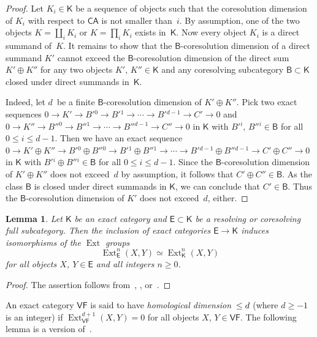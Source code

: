 \documentclass[12pt,a4paper]{amsart}
\newcommand{\+}{\nobreakdash-}
\renewcommand{\:}{\colon}
\newcommand{\rarrow}{\longrightarrow}
\DeclareMathOperator{\Ext}{Ext}
\newcommand{\sB}{\mathsf B}
\newcommand{\sE}{\mathsf E}
\newcommand{\sK}{\mathsf K}
\newcommand{\VF}{\mathsf{VF}}
\newcommand{\CA}{\mathsf{CA}}
\theoremstyle{plain}
\newtheorem{lem}[thm]{Lemma}
\theoremstyle{definition}
\begin{document}
\begin{proof}
 Let $K_i\in\sK$ be a sequence of objects such that the coresolution
dimension of $K_i$ with respect to $\CA$ is not smaller than~$i$.
 By assumption, one of the two objects $K=\coprod_i K_i$ or
$K=\prod_i K_i$ exists in~$\sK$.
 Now every object $K_i$ is a direct summand of~$K$.
 It remains to show that the $\sB$\+coresolution dimension of
a direct summand $K'$ cannot exceed the $\sB$\+coresolution dimension
of the direct sum $K'\oplus K''$ for any two objects $K'$, $K''\in\sK$
and any coresolving subcategory $\sB\subset\sK$ closed under direct
summands in~$\sK$.

 Indeed, let $d$~be a finite $\sB$\+coresolution dimension of
$K'\oplus K''$.
 Pick two exact sequences $0\rarrow K'\rarrow B'{}^0\rarrow B'{}^1
\rarrow\dotsb\rarrow B'{}^{d-1}\rarrow C'\rarrow0$ and
$0\rarrow K''\rarrow B''{}^0\rarrow B''{}^1\rarrow\dotsb\rarrow
B''{}^{d-1}\rarrow C''\rarrow0$ in $\sK$ with $B'{}^i$, $B''{}^i
\in\sB$ for all $0\le i\le d-1$.
 Then we have an exact sequence $0\rarrow K'\oplus K''\rarrow
B'{}^0\oplus B''{}^0\rarrow B'{}^1\oplus B''{}^1\rarrow\dotsb\rarrow
B'{}^{d-1}\oplus B''{}^{d-1}\rarrow C'\oplus C''\rarrow 0$ in $\sK$
with $B'{}^i\oplus B''{}^i\in\sB$ for all $0\le i\le d-1$.
 Since the $\sB$\+coresolution dimension of $K'\oplus K''$ does not
exceed~$d$ by assumption, it follows that $C'\oplus C''\in\sB$.
 As the class $\sB$ is closed under direct summands in $\sK$, we can
conclude that $C'\in\sB$.
 Thus the $\sB$\+coresolution dimension of $K'$ does not exceed~$d$,
either.
\end{proof}

\begin{lem} \label{co-resolving-Ext-agrees}
 Let\/ $\sK$ be an exact category and\/ $\sE\subset\sK$ be a resolving
or coresolving full subcategory.
 Then the inclusion of exact categories\/ $\sE\rarrow\sK$ induces
isomorphisms of the\/ $\Ext$ groups
$$
 \Ext^n_\sE(X,Y)\simeq\Ext^n_\sK(X,Y)
$$
for all objects $X$, $Y\in\sE$ and all integers $n\ge0$.
\end{lem}

\begin{proof}
 The assertion follows from~\cite[Theorem~12.1(b)]{Kel},
\cite[Proposition~13.2.2(i)]{KS},
or~\cite[Proposition~A.2.1 or~A.3.1(a)]{Pcosh}.
\end{proof}

 An exact category $\VF$ is said to have \emph{homological
dimension\/~$\le\nobreak d$} (where $d\ge-1$ is an integer) if
$\Ext_\VF^{d+1}(X,Y)=0$ for all objects $X$, $Y\in\VF$.
 The following lemma is a version of~\cite[Lemma~B.1.9]{Pcosh}.
\end{document}
